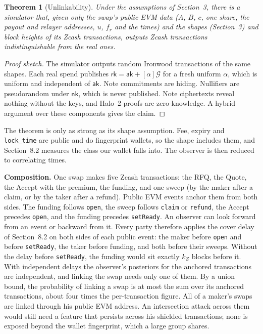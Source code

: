 \documentclass[10pt,letterpaper]{article}
\makeatletter
\renewcommand\subsection{\@startsection{subsection}{2}{\z@}{-0.9em}{0.25em}{\normalfont\normalsize\bfseries}}
\theoremstyle{plain}
\newtheorem{theorem}{Theorem}
\theoremstyle{definition}
\newcommand{\ak}{\mathsf{ak}}
\newcommand{\nk}{\mathsf{nk}}
\newcommand{\rk}{\mathsf{rk}}
\newcommand{\Gor}{\mathcal{G}}
\newcommand{\fn}[1]{\texttt{#1}}
\makeatother
\begin{document}
\subsection{What each observer learns}
\begin{theorem}[Unlinkability]
Under the assumptions of Section~3, there is a simulator that, given only the swap's public EVM
data ($A$, $B$, $c$, one share, the payout and relayer addresses, $u$, $f_r$ and the times) and
the shapes (Section~3) and block heights of its Zcash transactions, outputs Zcash transactions
indistinguishable from the real ones.
\end{theorem}
\begin{proof}[Proof sketch]
The simulator outputs random Ironwood transactions of the same shapes. Each real spend publishes
$\rk = \ak + [\alpha]\Gor$ for a fresh uniform $\alpha$, which is uniform and independent of $\ak$.
Note commitments are hiding. Nullifiers are pseudorandom under $\nk$, which is never published.
Note ciphertexts reveal nothing without the keys, and Halo~2 proofs are zero-knowledge. A hybrid
argument over these components gives the claim.
\end{proof}
The theorem is only as strong as its shape assumption. Fee, expiry and \texttt{lock\_time} are
public and do fingerprint wallets, so the shape includes them, and Section~8.2 measures the class
our wallet falls into. The observer is then reduced to correlating times.

\textbf{Composition.} One swap makes five Zcash transactions: the RFQ, the Quote, the Accept
with the premium, the funding, and one sweep (by the maker after a claim, or by the taker after a
refund). Public EVM events anchor them from both sides. The funding follows \fn{open}, the sweep
follows \fn{claim} or \fn{refund}, the Accept precedes \fn{open}, and the funding precedes
\fn{setReady}. An observer can look forward from an event or backward from it. Every party
therefore applies the cover delay of Section~8.2 on both sides of each public event: the maker
before \fn{open} and before \fn{setReady}, the taker before funding, and both before their sweeps.
Without the delay before \fn{setReady}, the funding would sit exactly $k_Z$ blocks before it. With
independent delays the observer's posteriors for the anchored transactions are independent, and
linking the swap needs only one of them. By a union bound, the probability of linking a swap is at
most the sum over its anchored transactions, about four times the per-transaction figure. All of
a maker's swaps are linked through his public EVM address. An intersection attack across them
would still need a feature that persists across his shielded transactions; none is exposed beyond
the wallet fingerprint, which a large group shares.
\end{document}
